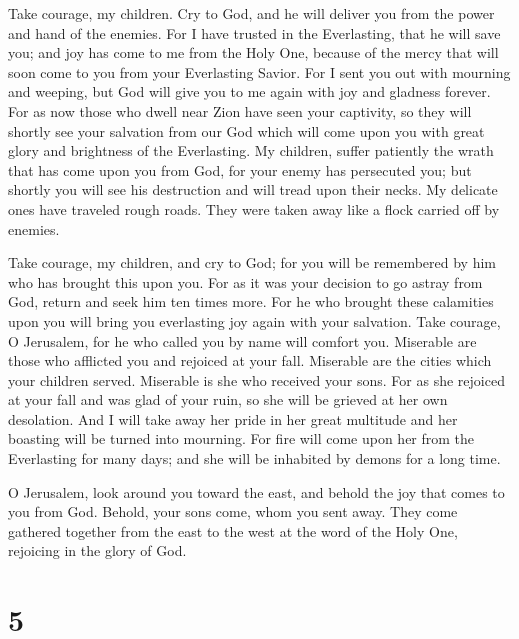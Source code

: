  Take courage, my children. Cry to God, and he will
deliver you from the power and hand of the enemies.  For
I have trusted in the Everlasting, that he will save you; and joy has
come to me from the Holy One, because of the mercy that will soon come
to you from your Everlasting Savior.  For I sent you out
with mourning and weeping, but God will give you to me again with joy
and gladness forever.  For as now those who dwell near
Zion have seen your captivity, so they will shortly see your salvation
from our God which will come upon you with great glory and brightness of
the Everlasting.  My children, suffer patiently the wrath
that has come upon you from God, for your enemy has persecuted you; but
shortly you will see his destruction and will tread upon their necks.
 My delicate ones have traveled rough roads. They were
taken away like a flock carried off by enemies.

 Take courage, my children, and cry to God; for you will
be remembered by him who has brought this upon you.  For
as it was your decision to go astray from God, return and seek him ten
times more.  For he who brought these calamities upon you
will bring you everlasting joy again with your salvation.
 Take courage, O Jerusalem, for he who called you by name
will comfort you.  Miserable are those who afflicted you
and rejoiced at your fall.  Miserable are the cities
which your children served. Miserable is she who received your sons.
 For as she rejoiced at your fall and was glad of your
ruin, so she will be grieved at her own desolation.  And
I will take away her pride in her great multitude and her boasting will
be turned into mourning.  For fire will come upon her
from the Everlasting for many days; and she will be inhabited by demons
for a long time.

 O Jerusalem, look around you toward the east, and behold
the joy that comes to you from God.  Behold, your sons
come, whom you sent away. They come gathered together from the east to
the west at the word of the Holy One, rejoicing in the glory of God.

\hypertarget{section-4}{%
\section{5}\label{section-4}}

